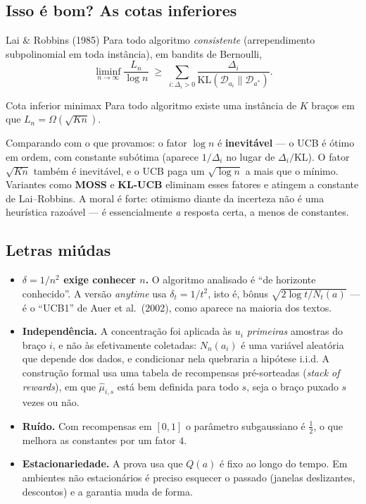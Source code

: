 \documentclass[11pt]{article}
\newcommand{\muh}{\widehat{\mu}}
\newcommand{\Dist}{\mathcal{D}}
\begin{document}
\subsection*{Isso é bom? As cotas inferiores}

\begin{teobox}{Lai \& Robbins (1985)}
Para todo algoritmo \emph{consistente} (arrependimento subpolinomial em toda
instância), em bandits de Bernoulli,
\[
  \liminf_{n\to\infty}\frac{L_n}{\log n}
  \;\ge\; \sum_{i:\Delta_i>0}\frac{\Delta_i}{\mathrm{KL}(\Dist_{a_i}\|\Dist_{a^{*}})}.
\]
\end{teobox}

\begin{teobox}{Cota inferior minimax}
Para todo algoritmo existe uma instância de $K$ braços em que
$L_n = \Omega(\sqrt{Kn})$.
\end{teobox}

Comparando com o que provamos: o fator $\log n$ é \textbf{inevitável} --- o UCB
é ótimo em ordem, com constante subótima (aparece $1/\Delta_i$ no lugar de
$\Delta_i/\mathrm{KL}$). O fator $\sqrt{Kn}$ também é inevitável, e o UCB paga
um $\sqrt{\log n}$ a mais que o mínimo. Variantes como \textbf{MOSS} e
\textbf{KL-UCB} eliminam esses fatores e atingem a constante de Lai--Robbins.
A moral é forte: otimismo diante da incerteza não é uma heurística razoável ---
é essencialmente \emph{a} resposta certa, a menos de constantes.

\subsection*{Letras miúdas}

\begin{itemize}
  \item \textbf{$\delta = 1/n^{2}$ exige conhecer $n$.} O algoritmo analisado é
        ``de horizonte conhecido''. A versão \emph{anytime} usa
        $\delta_t = 1/t^{2}$, isto é, bônus $\sqrt{2\log t/N_t(a)}$ --- é o
        ``UCB1'' de Auer et al.\ (2002), como aparece na maioria dos textos.
  \item \textbf{Independência.} A concentração foi aplicada às $u_i$
        \emph{primeiras} amostras do braço $i$, e não às efetivamente
        coletadas: $N_n(a_i)$ é uma variável aleatória que depende dos dados, e
        condicionar nela quebraria a hipótese i.i.d. A construção formal usa
        uma tabela de recompensas pré-sorteadas (\emph{stack of rewards}), em
        que $\muh_{i,s}$ está bem definida para todo $s$, seja o braço puxado
        $s$ vezes ou não.
  \item \textbf{Ruído.} Com recompensas em $[0,1]$ o parâmetro subgaussiano é
        $\tfrac12$, o que melhora as constantes por um fator $4$.
  \item \textbf{Estacionariedade.} A prova usa que $Q(a)$ é fixo ao longo do
        tempo. Em ambientes não estacionários é preciso esquecer o passado
        (janelas deslizantes, descontos) e a garantia muda de forma.
\end{itemize}
\end{document}
